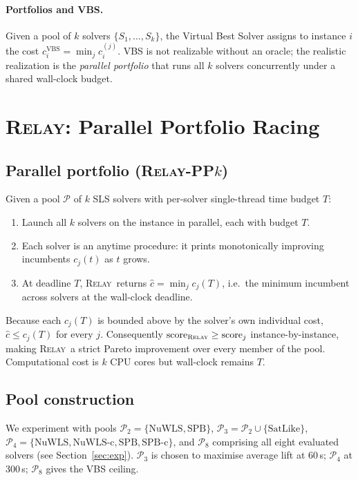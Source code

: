 \documentclass[11pt,letterpaper]{article}
\newcommand{\RELAY}{\textsc{Relay}}
\begin{document}
\paragraph{Portfolios and VBS.}  Given a pool of $k$ solvers $\{S_1,\ldots,S_k\}$, the Virtual Best Solver assigns to instance $i$ the cost $c_i^{\text{VBS}} = \min_j c_i^{(j)}$.  VBS is not realizable without an oracle; the realistic realization is the \emph{parallel portfolio} that runs all $k$ solvers concurrently under a shared wall-clock budget.

\section{\RELAY: Parallel Portfolio Racing}

\subsection{Parallel portfolio (\RELAY-PP$k$)}

Given a pool $\mathcal{P}$ of $k$ SLS solvers with per-solver single-thread time budget $T$:

\begin{enumerate}
    \item Launch all $k$ solvers on the instance in parallel, each with budget $T$.
    \item Each solver is an anytime procedure: it prints monotonically improving incumbents $c_j(t)$ as $t$ grows.
    \item At deadline $T$, \RELAY\ returns $\hat{c} = \min_j c_j(T)$, i.e.\ the minimum incumbent across solvers at the wall-clock deadline.
\end{enumerate}

Because each $c_j(T)$ is bounded above by the solver's own individual cost, $\hat{c} \le c_j(T)$ for every $j$.  Consequently $\text{score}_{\text{\RELAY}} \ge \text{score}_j$ instance-by-instance, making \RELAY\ a strict Pareto improvement over every member of the pool.  Computational cost is $k$ CPU cores but wall-clock remains $T$.

\subsection{Pool construction}

We experiment with pools $\mathcal{P}_2 = \{\text{NuWLS}, \text{SPB}\}$, $\mathcal{P}_3 = \mathcal{P}_2 \cup \{\text{SatLike}\}$, $\mathcal{P}_4 = \{\text{NuWLS}, \text{NuWLS-c}, \text{SPB}, \text{SPB-c}\}$, and $\mathcal{P}_8$ comprising all eight evaluated solvers (see Section~\ref{sec:exp}).  $\mathcal{P}_3$ is chosen to maximise average lift at 60\,s; $\mathcal{P}_4$ at 300\,s; $\mathcal{P}_8$ gives the VBS ceiling.
\end{document}
